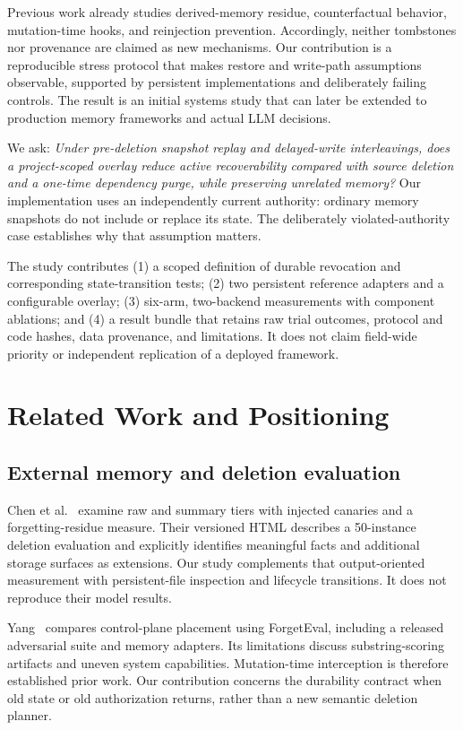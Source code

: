 ﻿\documentclass[sigconf,nonacm]{acmart}
\begin{document}
Previous work already studies derived-memory residue, counterfactual behavior, mutation-time hooks, and reinjection prevention. Accordingly, neither tombstones nor provenance are claimed as new mechanisms. Our contribution is a reproducible stress protocol that makes restore and write-path assumptions observable, supported by persistent implementations and deliberately failing controls. The result is an initial systems study that can later be extended to production memory frameworks and actual LLM decisions.

We ask: \emph{Under pre-deletion snapshot replay and delayed-write interleavings, does a project-scoped overlay reduce active recoverability compared with source deletion and a one-time dependency purge, while preserving unrelated memory?} Our implementation uses an independently current authority: ordinary memory snapshots do not include or replace its state. The deliberately violated-authority case establishes why that assumption matters.

The study contributes (1) a scoped definition of durable revocation and corresponding state-transition tests; (2) two persistent reference adapters and a configurable overlay; (3) six-arm, two-backend measurements with component ablations; and (4) a result bundle that retains raw trial outcomes, protocol and code hashes, data provenance, and limitations. It does not claim field-wide priority or independent replication of a deployed framework.

\section{Related Work and Positioning}
\subsection{External memory and deletion evaluation}
Chen et al.~\cite{chen2026} examine raw and summary tiers with injected canaries and a forgetting-residue measure. Their versioned HTML describes a 50-instance deletion evaluation and explicitly identifies meaningful facts and additional storage surfaces as extensions. Our study complements that output-oriented measurement with persistent-file inspection and lifecycle transitions. It does not reproduce their model results.

Yang~\cite{yang2026} compares control-plane placement using ForgetEval, including a released adversarial suite and memory adapters. Its limitations discuss substring-scoring artifacts and uneven system capabilities. Mutation-time interception is therefore established prior work. Our contribution concerns the durability contract when old state or old authorization returns, rather than a new semantic deletion planner.
\end{document}
